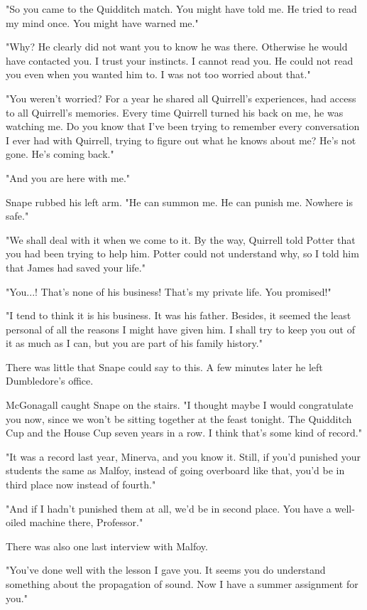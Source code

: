 \documentclass[a4paper,11pt]{article}
\begin{document}
"So you came to the Quidditch match. You might have told me. He tried to read my mind once. You might have warned me."

"Why? He clearly did not want you to know he was there. Otherwise he would have contacted you. I trust your instincts. I cannot read you. He could not read you even when you wanted him to. I was not too worried about that."

"You weren't worried? For a year he shared all Quirrell's experiences, had access to all Quirrell's memories. Every time Quirrell turned his back on me, he was watching me. Do you know that I've been trying to remember every conversation I ever had with Quirrell, trying to figure out what he knows about me? He's not gone. He's coming back."

"And you are here with me."

Snape rubbed his left arm. "He can summon me. He can punish me. Nowhere is safe."

"We shall deal with it when we come to it. By the way, Quirrell told Potter that you had been trying to help him. Potter could not understand why, so I told him that James had saved your life."

"You...! That's none of his business! That's my private life. You promised!"

"I tend to think it is his business. It was his father. Besides, it seemed the least personal of all the reasons I might have given him. I shall try to keep you out of it as much as I can, but you are part of his family history."

There was little that Snape could say to this. A few minutes later he left Dumbledore's office.

McGonagall caught Snape on the stairs. "I thought maybe I would congratulate you now, since we won't be sitting together at the feast tonight. The Quidditch Cup and the House Cup seven years in a row. I think that's some kind of record."

"It was a record last year, Minerva, and you know it. Still, if you'd punished your students the same as Malfoy, instead of going overboard like that, you'd be in third place now instead of fourth."

"And if I hadn't punished them at all, we'd be in second place. You have a well-oiled machine there, Professor."

There was also one last interview with Malfoy.

"You've done well with the lesson I gave you. It seems you do understand something about the propagation of sound. Now I have a summer assignment for you."
\end{document}
